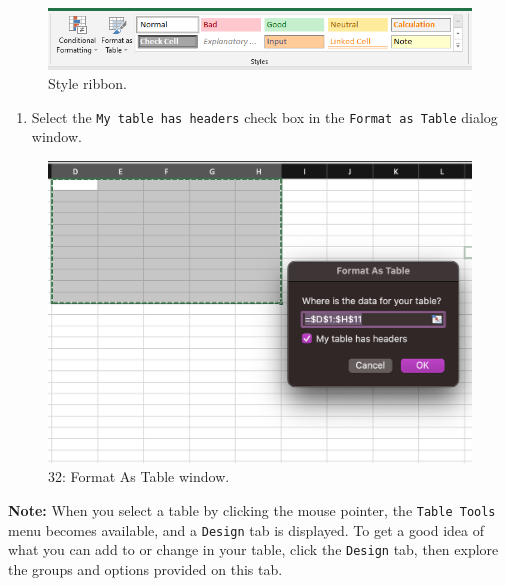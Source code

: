 \documentclass[
]{book}
\providecommand{\tightlist}{%
  \setlength{\itemsep}{0pt}\setlength{\parskip}{0pt}}
\begin{document}
\begin{figure}

{\centering \includegraphics[width=0.9\linewidth]{images/style-pc} 

}

\caption{Style ribbon.}\label{fig:table-style-group}
\end{figure}

\begin{enumerate}
\def\labelenumi{\arabic{enumi}.}
\setcounter{enumi}{2}
\tightlist
\item
  Select the \texttt{My\ table\ has\ headers} check box in the \texttt{Format\ as\ Table} dialog window.
\end{enumerate}

\begin{figure}

{\centering \includegraphics[width=0.7\linewidth]{images/format-table} 

}

\caption{32: Format As Table window.}\label{fig:format-as-table}
\end{figure}

\textbf{Note:} When you select a table by clicking the mouse pointer, the \texttt{Table\ Tools} menu becomes available, and a \texttt{Design} tab is displayed. To get a good idea of what you can add to or change in your table, click the \texttt{Design} tab, then explore the groups and options provided on this tab.
\end{document}
